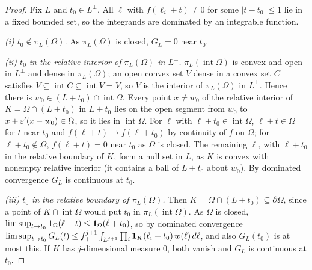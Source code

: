 \documentclass[11pt]{article}
\begin{document}
\begin{proof}
Fix $L$ and $t_0\in L^\perp$. All $\ell$ with $f(\ell_i+t)\ne0$ for some $|t-t_0|\le1$ lie in a fixed bounded set, so the
integrands are dominated by an integrable function.

\emph{(i) $t_0\notin\pi_L(\Omega)$.} As $\pi_L(\Omega)$ is closed, $G_L=0$ near $t_0$.

\emph{(ii) $t_0$ in the relative interior of $\pi_L(\Omega)$ in $L^\perp$.} $\pi_L(\operatorname{int}\Omega)$ is convex and open in $L^\perp$
and dense in $\pi_L(\Omega)$; an open convex set $V$ dense in a convex set $C$ satisfies
$V\subseteq\operatorname{int}C\subseteq\operatorname{int}\overline V=V$, so $V$ is the interior of $\pi_L(\Omega)$ in $L^\perp$. Hence there is
$w_0\in(L+t_0)\cap\operatorname{int}\Omega$. Every
point $x\ne w_0$ of the relative interior of $K=\Omega\cap(L+t_0)$ in $L+t_0$ lies on the open segment from $w_0$ to
$x+\varepsilon'(x-w_0)\in\Omega$, so it lies in $\operatorname{int}\Omega$. For $\ell$ with $\ell+t_0\in\operatorname{int}\Omega$, $\ell+t\in\Omega$ for $t$ near
$t_0$ and $f(\ell+t)\to f(\ell+t_0)$ by continuity of $f$ on $\Omega$; for $\ell+t_0\notin\Omega$, $f(\ell+t)=0$ near $t_0$ as
$\Omega$ is closed. The remaining $\ell$, with $\ell+t_0$ in the relative boundary of $K$, form a null set in $L$, as $K$ is
convex with nonempty relative interior (it contains a ball of $L+t_0$ about $w_0$). By dominated convergence $G_L$ is
continuous at $t_0$.

\emph{(iii) $t_0$ in the relative boundary of $\pi_L(\Omega)$.} Then $K=\Omega\cap(L+t_0)\subseteq\partial\Omega$, since a point of
$K\cap\operatorname{int}\Omega$ would put $t_0$ in $\pi_L(\operatorname{int}\Omega)$. As $\Omega$ is closed,
$\limsup_{t\to t_0}\mathbf{1}_\Omega(\ell+t)\le\mathbf{1}_\Omega(\ell+t_0)$, so by dominated convergence
$\limsup_{t\to t_0}G_L(t)\le f_+^{j+1}\int_{L^{j+1}}\prod_i\mathbf{1}_K(\ell_i+t_0)\,w(\ell)\,d\ell$, and also $G_L(t_0)$ is at most this. If
$K$ has $j$-dimensional measure $0$, both vanish and $G_L$ is continuous at $t_0$.


\end{proof}
\end{document}
